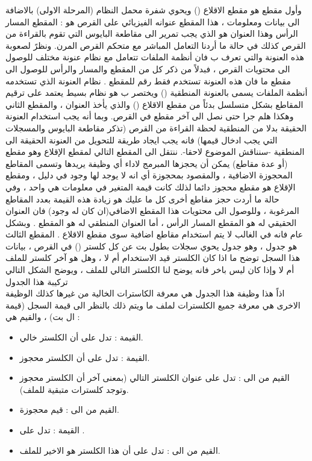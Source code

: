 \documentclass[document.tex]{subfiles}
\begin{document}
وأول مقطع هو مقطع الاقلاع () ويحوي شفرة محمل النظام (المرحلة الاولى) بالاضافة الى بيانات ومعلومات  ، هذا المقطع عنوانه الفيزيائي على القرص هو : المقطع  المسار  الرأس  وهذا العنوان هو الذي يجب تمرير الى مقاطعة البايوس  التي تقوم بالقراءة من القرص كذلك في حالة ما أردنا التعامل المباشر مع متحكم القرص المرن.
ونظرً لصعوبة هذه العنونة والتي تعرف ب  فان أنظمة الملفات تتعامل مع نظام عنونة مختلف للوصول الى محتويات القرص ، فبدلاً من ذكر كل من المقطع والمسار والرأس للوصول الى مقطع ما فان هذه العنونة تستخدم فقط رقم للمقطع .
نظام العنونة الذي تستخدمه أنظمة الملفات يسمى بالعنونة المنطقية () ويختصر ب  هو نظام بسيط يعتمد على ترقيم المقاطع بشكل متسلسل بدئاً من مقطع الاقلاع () والذي يأخذ العنوان  ، والمقطع الثاني  وهكذا هلم جرا حتى نصل الى آخر مقطع في القرص. وبما أنه يجب استخدام العنونة الحقيقة بدلا من المنطقية لحظة القراءة من القرص (تذكر مقاطعة البايوس  والمسجلات التي يجب ادخال قيمها) فانه يجب ايجاد طريقة للتحويل من العنونة الحقيقة الى المنطقية -سنناقش الموضوع لاحقا-.
ننتقل الى المقطع التالي لمقطع الإقلاع وهو مقطع (أو عدة مقاطع) يمكن أن يحجزها المبرمج لاداء أي وظيفة يريدها وتسمى المقاطع المحجوزة الاضافية  ، والمقصود بمحجوزة أي انه لا يوجد لها وجود في دليل  ، ومقطع الإقلاع هو مقطع محجوز دائما لذلك كانت قيمة المتغير   في معلومات  هي واحد ، وفي حالة ما أردت حجز مقاطع أخرى كل ما عليك هو زيادة هذه القيمة بعدد المقاطع المرغوبة ، وللوصول الى محتويات هذا المقطع الاضافي(ان كان له وجود) فان العنوان الحقيقي له هو المقطع  المسار  الرأس  ، أما العنوان المنطقي له هو المقطع . وبشكل عام فانه في الغالب لا يتم استخدام مقاطع اضافية سوى مقطع الاقلاع .
المقطع الثالث هو جدول  ، وهو جدول يحوي سجلات بطول  بت عن كل كلستر () في القرص ، بيانات هذا السجل توضح ما اذا كان الكلستر قيد الاستخدام أم لا ، وهل هو آخر كلستر للملف أم لا وإذا كان ليس باخر فانه يوضح لنا الكلستر التالي للملف ، ويوضح الشكل التالي تركيبة هذا الجدول\\

اذاً هذا وظيفة هذا الجدول هي معرفة الكاسترات الخالية من غيرها كذلك الوظيفة الاخرى هي معرفة جميع الكلسترات لملف ما ويتم ذلك بالنظر الى قيمة السجل (قيمة ال  بت) ، والقيم هي :

\begin{itemize}
\item القيمة : تدل على أن الكلستر خالي.
\item القيمة  : تدل على أن الكلستر محجوز.
\item القيم من  الى  : تدل على عنوان الكلستر التالي (بمعنى آخر أن الكلستر محجوز وتوجد كلسترات متبقية للملف).
\item القيم من  الى : قيم محجوزة.
\item القيمة  : تدل على .
\item القيم من  الى : تدل على أن هذا الكلستر هو الاخير للملف. 

\end{itemize}
\end{document}
